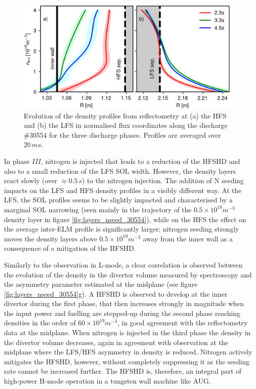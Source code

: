 \documentclass[12pt]{iopart}
\begin{document}
\begin{figure}[!bt]
\centering
\includegraphics[]{perfs_30554.png}
\caption[Density profile evolution for discharge \#30554.]{Evolution of the density profiles from reflectometry at (a) the HFS and (b) the LFS in normalised flux coordinates along the discharge \#30554 for the three discharge phases. Profiles are averaged over $20\,ms$.}
\label{fig:perfs_30554}
\end{figure}

In phase $III$, nitrogen is injected that leads to a reduction of the HFSHD and also to a small reduction of the LFS SOL width. However, the density layers react slowly (over $\approx 0.5\,s$) to  the nitrogen injection.
The addition of N seeding impacts on the LFS and HFS density profiles in a visibly different way. At the LFS, the SOL profiles seems to be slightly impacted and characterised by a marginal SOL narrowing (seen mainly in the trajectory of the $0.5\times10^{19}m^{-3}$ density layer in figure \ref{fig:layers_nseed_30554}), while on the HFS the effect on the average inter-ELM profile is significantly larger; nitrogen seeding strongly moves the density layers above $0.5\times10^{19}m^{-3}$ away from the inner wall as a consequence of a mitigation of the HFSHD. 

Similarly to the observation in L-mode, a clear correlation is observed between the evolution of the density in the divertor volume measured by spectroscopy and the asymmetry parameter estimated at the midplane (see figure \ref{fig:layers_nseed_30554}g). A HFSHD is observed to develop at the inner divertor during the first phase, that then increases strongly in magnitude when the input power and fuelling are stepped-up during the second phase reaching densities in the order of $60\times10^{19}m^{-3}$, in good agreement with the reflectometry data at the midplane. When nitrogen is injected in the third phase the density in the divertor volume decreases, again in agreement with observation at the midplane where the LFS/HFS asymmetry in density is reduced. Nitrogen actively mitigates the HFSHD, however, without completely suppressing it as the seeding rate cannot be increased further. The HFSHD is, therefore, an integral part of high-power H-mode operation in a tungsten wall machine like AUG.
\end{document}

